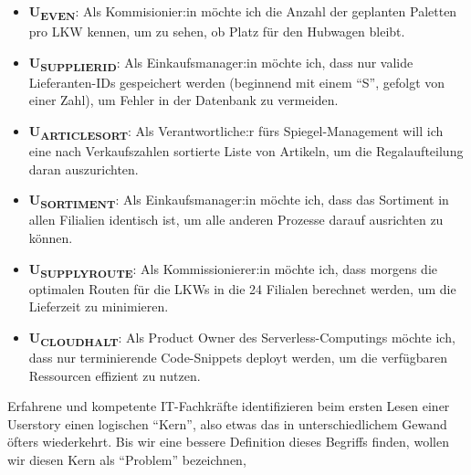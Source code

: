 \begin{itemize}
    \item \textbf{U\textsubscript{EVEN}}:
        Als Kommisionier:in möchte ich die Anzahl der geplanten Paletten pro LKW kennen, 
        um zu sehen, ob Platz für den Hubwagen bleibt.
     \item \textbf{U\textsubscript{SUPPLIERID}}:
        Als Einkaufsmanager:in möchte ich,
        dass nur valide Lieferanten-IDs gespeichert werden
        (beginnend mit einem ``S'', gefolgt von einer Zahl),
        um Fehler in der Datenbank zu vermeiden.
     \item \textbf{U\textsubscript{ARTICLESORT}}:
        Als Verantwortliche:r fürs Spiegel-Management
        will ich eine nach Verkaufszahlen sortierte Liste von Artikeln,
        um die Regalaufteilung daran auszurichten.
    \item \textbf{U\textsubscript{SORTIMENT}}:
        Als Einkaufsmanager:in möchte ich,
        dass das Sortiment in allen Filialien identisch ist,
        um alle anderen Prozesse darauf ausrichten zu können.
    \item \textbf{U\textsubscript{SUPPLYROUTE}}:
        Als Kommissionierer:in möchte ich,
        dass morgens die optimalen Routen für die LKWs in die 24 Filialen berechnet werden,
        um die Lieferzeit zu minimieren.
    \item \textbf{U\textsubscript{CLOUDHALT}}:
        Als Product Owner des Serverless-Computings möchte ich,
        dass nur terminierende Code-Snippets deployt werden,
        um die verfügbaren Ressourcen effizient zu nutzen.
\end{itemize}

Erfahrene und kompetente IT-Fachkräfte identifizieren beim ersten Lesen einer Userstory
einen logischen ``Kern'',
also etwas das in unterschiedlichem Gewand öfters wiederkehrt.
Bis wir eine bessere Definition dieses Begriffs finden,
wollen wir diesen Kern als ``Problem'' bezeichnen,

